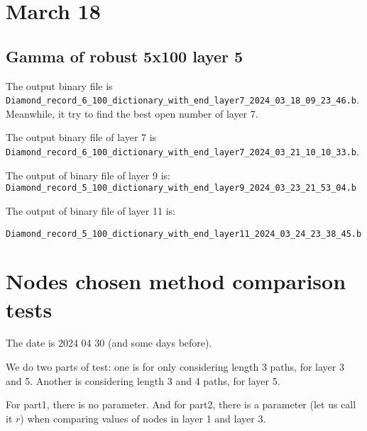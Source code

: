 \documentclass{llncs}
\begin{document}
\section{March 18}

\subsection*{Gamma of robust 5x100 layer 5}

The output binary file is \verb*|Diamond_record_6_100_dictionary_with_end_layer7_2024_03_18_09_23_46.b|. Meanwhile, it try to find the best open number of layer 7.


The output binary file of layer 7 is \verb*|Diamond_record_6_100_dictionary_with_end_layer7_2024_03_21_10_10_33.b|.


The output of binary file of layer 9 is: \verb*|Diamond_record_5_100_dictionary_with_end_layer9_2024_03_23_21_53_04.b|

The output of binary file of layer 11 is:

\verb*|Diamond_record_5_100_dictionary_with_end_layer11_2024_03_24_23_38_45.b|


\section{Nodes chosen method comparison tests}

The date is 2024 04 30 (and some days before).

We do two parts of test: one is for only considering length 3 paths, for layer 3 and 5. Another is considering length 3 and 4 paths, for layer 5.

For part1, there is no parameter. And for part2, there is a parameter (let us call it $r$) when comparing values of nodes in layer 1 and layer 3. 
\end{document}
